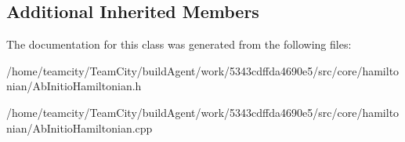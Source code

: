 \subsection*{Additional Inherited Members}


The documentation for this class was generated from the following files\+:\begin{DoxyCompactItemize}
\item 
/home/teamcity/\+Team\+City/build\+Agent/work/5343cdffda4690e5/src/core/hamiltonian/Ab\+Initio\+Hamiltonian.\+h\item 
/home/teamcity/\+Team\+City/build\+Agent/work/5343cdffda4690e5/src/core/hamiltonian/Ab\+Initio\+Hamiltonian.\+cpp\end{DoxyCompactItemize}
